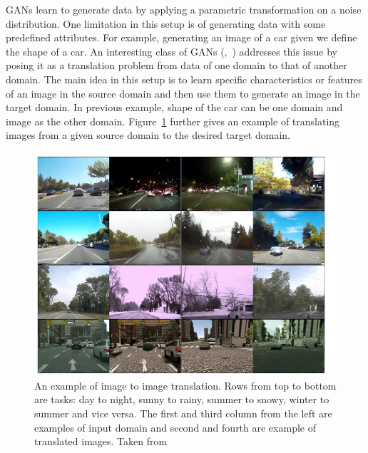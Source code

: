 GANs learn to generate data by applying a parametric transformation on a noise distribution. One limitation in this setup is of generating data with some predefined attributes. For example, generating an image of a car given we define the shape of a car.
An interesting class of GANs (\cite{zhu2017unpaired},~\cite{liu2017unsupervised}) addresses this issue by posing it as a translation problem from data of one domain to that of another domain. The main idea in this setup is to learn specific characteristics or features of an image in the source domain and then use them to generate an image in the target domain. In previous example, shape of the car can be one domain and image as the other domain. Figure~\ref{fig:imagetoimage} further gives an example of translating images from a given source domain to the desired target domain.

\begin{figure}
    \centering
    \includegraphics[width=0.85\columnwidth]{master_thesis_template/figs/image-to-image.PNG}
    \caption[An example of image to image translation.]{An example of image to image translation. Rows from top to bottom are tasks: day to night, sunny to rainy, summer to snowy, winter to summer and vice versa. The first and third column from the left are examples of input domain and second and fourth are example of translated images. Taken from \cite{liu2017unsupervised}}
    \label{fig:imagetoimage}
\end{figure}



